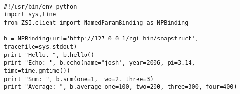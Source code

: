 \begin{verbatim}

#!/usr/bin/env python
import sys,time
from ZSI.client import NamedParamBinding as NPBinding

b = NPBinding(url='http://127.0.0.1/cgi-bin/soapstruct', tracefile=sys.stdout)
print "Hello: ", b.hello()
print "Echo: ", b.echo(name="josh", year=2006, pi=3.14, time=time.gmtime())
print "Sum: ", b.sum(one=1, two=2, three=3)
print "Average: ", b.average(one=100, two=200, three=300, four=400)

\end{verbatim}
